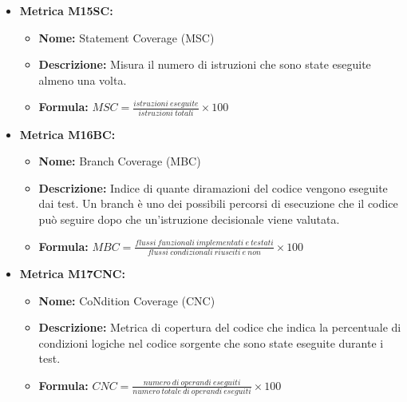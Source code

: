 \begin{itemize}
          \item \textbf{Metrica M15SC:}
          \begin{itemize}
              \item \textbf{Nome:} Statement Coverage (MSC)
              \item \textbf{Descrizione:} Misura il numero di istruzioni che sono state eseguite almeno una volta.
              \item \textbf{Formula:} $MSC = \frac{istruzioni \ eseguite}{istruzioni \ totali} \times 100$
          \end{itemize}

          \item \textbf{Metrica M16BC:}
          \begin{itemize}
              \item \textbf{Nome:} Branch Coverage (MBC)
              \item \textbf{Descrizione:} Indice di quante diramazioni del codice vengono eseguite dai test. Un branch è uno dei possibili percorsi di esecuzione che il codice può seguire dopo che un'istruzione decisionale viene valutata.
              \item \textbf{Formula:} $MBC = \frac{flussi \ funzionali \ implementati \ e \ testati}{flussi \ condizionali \ riusciti \ e \ non} \times 100$
          \end{itemize}

          \item \textbf{Metrica M17CNC:}
          \begin{itemize}
              \item \textbf{Nome:} CoNdition Coverage (CNC)
              \item \textbf{Descrizione:} Metrica di copertura del codice che indica la percentuale di condizioni logiche nel codice sorgente che sono state eseguite durante i test.
              \item \textbf{Formula:} $CNC = \frac{numero \ di \ operandi \ eseguiti}{numero \ totale \ di \ operandi \ eseguiti} \times 100$
          \end{itemize}
\end{itemize}